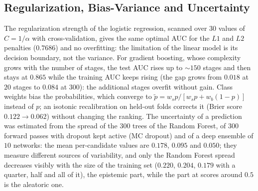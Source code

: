 \subsection{Regularization, Bias-Variance and Uncertainty}
\label{sec:ml_regcal}
\label{sec:ml_uncertainty}
The regularization strength of the logistic regression, scanned over $30$ values of $C=1/\alpha$ with cross-validation, gives the same optimal AUC for the $L1$ and $L2$ penalties ($0.7686$) and no overfitting: the limitation of the linear model is its decision boundary, not the variance. For gradient boosting, whose complexity grows with the number of stages, the test AUC rises up to $\sim150$ stages and then stays at $0.865$ while the training AUC keeps rising (the gap grows from $0.018$ at $20$ stages to $0.084$ at $300$): the additional stages overfit without gain. Class weights bias the probabilities, which converge to $\tilde p=w_sp/[w_sp+w_b(1-p)]$ instead of $p$; an isotonic recalibration on held-out folds corrects it (Brier score $0.122\to0.062$) without changing the ranking. The uncertainty of a prediction was estimated from the spread of the $300$ trees of the Random Forest, of $300$ forward passes with dropout kept active (MC dropout) and of a deep ensemble of $10$ networks: the mean per-candidate values are $0.178$, $0.095$ and $0.050$; they measure different sources of variability, and only the Random Forest spread decreases visibly with the size of the training set ($0.220$, $0.204$, $0.179$ with a quarter, half and all of it), the epistemic part, while the part at scores around $0.5$ is the aleatoric one.


